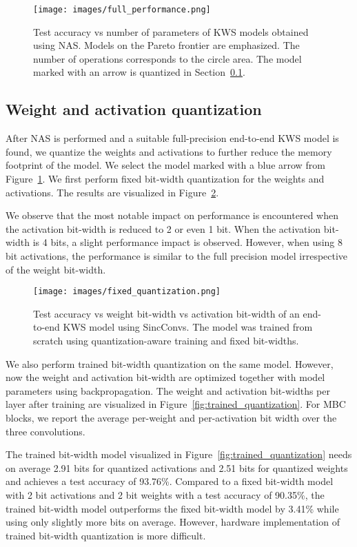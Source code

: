 \documentclass[a4paper]{article}
\begin{document}
\begin{figure}[t]
	\centerline{\texttt{[image: images/full\_performance.png]}}
	\caption{Test accuracy vs number of parameters of KWS models obtained using NAS. Models on the Pareto frontier are emphasized. The number of operations corresponds to the circle area. The model marked with an arrow is quantized in Section~\ref{sec:quantization_exp}.}
	\label{fig:full_performance}
\end{figure}

\subsection{Weight and activation quantization}
\label{sec:quantization_exp}
After NAS is performed and a suitable full-precision end-to-end KWS model is found, we quantize the weights and activations to further reduce the memory footprint of the model. We select the model marked with a blue arrow from Figure~\ref{fig:full_performance}. We first perform fixed bit-width quantization for the weights and activations. The results are visualized in Figure~\ref{fig:fixed_quantization}.

We observe that the most notable impact on performance is encountered when the activation bit-width is reduced to 2 or even 1 bit. When the activation bit-width is 4 bits, a slight performance impact is observed. However, when using 8 bit activations, the performance is similar to the full precision model irrespective of the weight bit-width. 

\begin{figure}[t]
	\centerline{\texttt{[image: images/fixed\_quantization.png]}}
	\caption{Test accuracy vs weight bit-width vs activation bit-width of an end-to-end KWS model using SincConvs. The model was trained from scratch using quantization-aware training and fixed bit-widths.}
	\label{fig:fixed_quantization}
\end{figure}

We also perform trained bit-width quantization on the same model. However, now the weight and activation bit-width are optimized together with model parameters using backpropagation. The weight and activation bit-widths per layer after training are visualized in Figure~\ref{fig:trained_quantization}. For MBC blocks, we report the average per-weight and per-activation bit width over the three convolutions.

The trained bit-width model visualized in Figure~\ref{fig:trained_quantization} needs on average 2.91 bits for quantized activations and 2.51 bits for quantized weights and achieves a test accuracy of 93.76\%. Compared to a fixed bit-width model with 2 bit activations and 2 bit weights with a test accuracy of 90.35\%, the trained bit-width model outperforms the fixed bit-width model by 3.41\% while using only slightly more bits on average. However, hardware implementation of trained bit-width quantization is more difficult.
\end{document}
